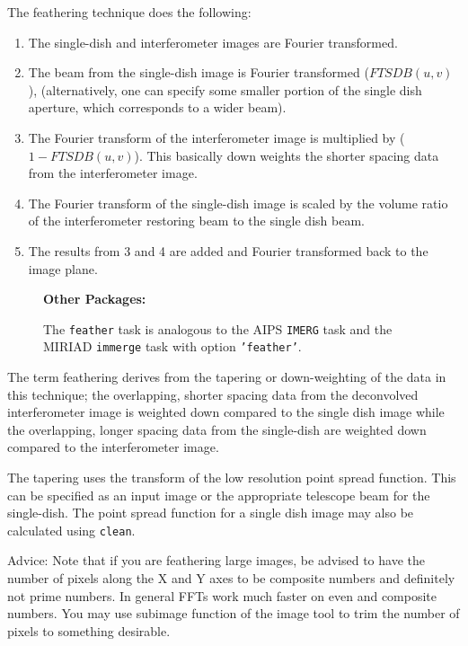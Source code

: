 The feathering technique does the following:
\begin{enumerate}
\item The single-dish and interferometer images are Fourier
      transformed. 
    \item The beam from the single-dish image is Fourier transformed
      ($FTSDB(u,v)$), (alternatively, one can specify some smaller
      portion of the single dish aperture, which corresponds to a
      wider beam).
\item The Fourier transform of the interferometer image is multiplied
      by ($1-FTSDB(u,v)$).  This basically down weights the shorter
      spacing data from the interferometer image.
\item The Fourier transform of the single-dish image is scaled by the
      volume ratio of the interferometer restoring beam to the single
      dish beam.
\item The results from 3 and 4 are added and Fourier transformed
      back to the image plane.
\end{enumerate}

\begin{wrapfigure}{r}{2.5in}
  \begin{boxedminipage}{2.5in}
     \centerline{\bf Other Packages:}
     The {\tt feather} task is analogous to the AIPS {\tt IMERG} 
     task and the MIRIAD {\tt immerge} task with option 
     {\tt 'feather'}.
  \end{boxedminipage}
\end{wrapfigure}
The term feathering derives from the tapering or down-weighting of the
data in this technique; the overlapping, shorter spacing data from the
deconvolved interferometer image is weighted down compared to the
single dish image while the overlapping, longer spacing data from the
single-dish are weighted down compared to the interferometer image.

The tapering uses the transform of the low resolution point spread
function. This can be specified as an input image or the appropriate
telescope beam for the single-dish.  The point spread function for a
single dish image may also be calculated using {\tt clean}.

Advice: Note that if you are feathering large images, be advised to
have the number of pixels along the X and Y axes to be composite
numbers and definitely not prime numbers. In general FFTs work much
faster on even and composite numbers. You may use subimage function of
the image tool to trim the number of pixels to something desirable.

